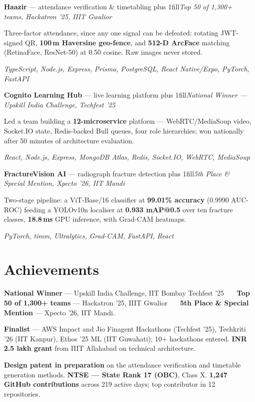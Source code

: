 \documentclass[a4paper,10pt]{article}
\newcommand{\pushright}{\hskip 0pt plus 1fill\relax}
\newcommand{\project}[2]{%
  #1\pushright\textit{#2}%
}
\begin{document}
\project{\textbf{Haazir} --- attendance verification \& timetabling}{Top 50 of 1,300+ teams, Hackatron '25, IIIT Gwalior}
\begin{bullets}
  \item Three-factor attendance, since any one signal can be defeated: rotating JWT-signed QR, \textbf{100\,m Haversine geo-fence}, and \textbf{512-D ArcFace} matching (RetinaFace, ResNet-50) at 0.50 cosine. Raw images never stored.
  \item \textit{TypeScript, Node.js, Express, Prisma, PostgreSQL, React Native/Expo, PyTorch, FastAPI}
\end{bullets}

\project{\textbf{Cognito Learning Hub} --- live learning platform}{National Winner --- Upskill India Challenge, Techfest '25}
\begin{bullets}
  \item Led a team building a \textbf{12-microservice} platform --- WebRTC/MediaSoup video, Socket.IO state, Redis-backed Bull queues, four role hierarchies; won nationally after 50 minutes of architecture evaluation.
  \item \textit{React, Node.js, Express, MongoDB Atlas, Redis, Socket.IO, WebRTC, MediaSoup}
\end{bullets}

\project{\textbf{FractureVision AI} --- radiograph fracture detection}{5th Place \& Special Mention, Xpecto '26, IIT Mandi}
\begin{bullets}
  \item Two-stage pipeline: a ViT-Base/16 classifier at \textbf{99.01\% accuracy} (0.9990 AUC-ROC) feeding a YOLOv10n localiser at \textbf{0.933 mAP@0.5} over ten fracture classes, \textbf{18.8\,ms} GPU inference, with Grad-CAM heatmaps.
  \item \textit{PyTorch, timm, Ultralytics, Grad-CAM, FastAPI, React}
\end{bullets}

\section{Achievements}
\begin{bullets}
  \item \textbf{National Winner} --- Upskill India Challenge, IIT Bombay Techfest '25 \ \textbar\ \ \textbf{Top 50 of 1,300+ teams} --- Hackatron '25, IIIT Gwalior \ \textbar\ \ \textbf{5th Place \& Special Mention} --- Xpecto '26, IIT Mandi.
  \item \textbf{Finalist} --- AWS Impact and Jio Finagent Hackathons (Techfest '25), Techkriti '26 (IIT Kanpur), Ethos '25 ML (IIT Guwahati); 10+ hackathons entered. \textbf{INR 2.5 lakh grant} from IIIT Allahabad on technical architecture.
  \item \textbf{Design patent in preparation} on the attendance verification and timetable generation methods. \textbf{NTSE --- State Rank 17 (OBC)}, Class X. \textbf{1,247 GitHub contributions} across 219 active days; top contributor in 12 repositories.
\end{bullets}
\end{document}
